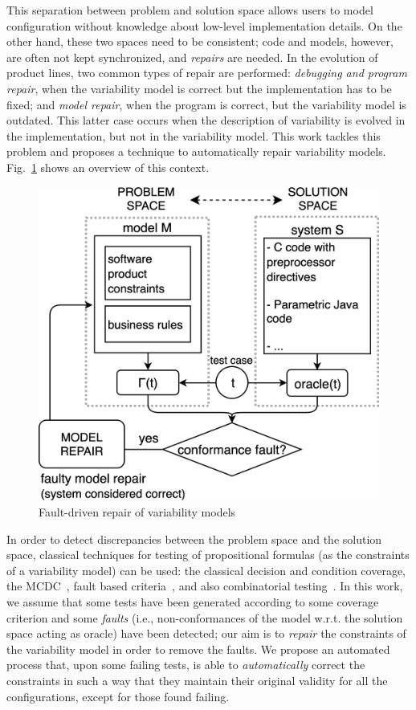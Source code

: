 \begin{tikzborder}{\cite{Gargantini16:validation}}
\begin{tikzborder}{\cite{gargantini_combinatorial_2017}}
\begin{tikzborder}{\cite{gargantini_combinatorial_2017}}
\begin{tikzborder}{\cite{garn2019}}
\begin{tikzborder}{\cite{arcaini2019achieving}}
	This separation between problem and solution space allows users to model configuration without knowledge about low-level implementation details. On the other hand, these two spaces need to be consistent; code and models, however, are often not kept synchronized, and {\it repairs} are needed. In the evolution of product lines, two common types of repair are performed: \textit{debugging and program repair}, when the variability model is correct but the implementation has to be fixed; and \textit{model repair}, when the program is correct, but the variability model is outdated. This latter case occurs when the description of variability is evolved in the implementation, but not in the variability model. This work tackles this problem and proposes a technique to automatically repair variability models. Fig.~\ref{fig:problem_solution} shows an overview of this context.
	\begin{figure}[!htb]
		\centering
		\includegraphics[width=.7\columnwidth]{images/problemSolution_new.png}
		\caption{Fault-driven repair of variability models}
		\label{fig:problem_solution}
	\end{figure}
	
	In order to detect discrepancies between the problem space and the solution space, classical techniques for testing of propositional formulas (as the constraints of a variability model) can be used: the classical decision and condition coverage, the MCDC~\cite{sej.1994.0025}, fault based criteria~\cite{compj15}, and also combinatorial testing~\cite{icst2015}. In this work, we assume that some tests have been generated according to some coverage criterion and some \emph{faults} (i.e., non-conformances of the model w.r.t. the solution space acting as oracle) have been detected; our aim is to \emph{repair} the constraints of the variability model in order to remove the faults. We propose an automated process that, upon some failing tests, is able to \emph{automatically} correct the constraints in such a way that they maintain their original validity for all the configurations, except for those found failing.
	

\end{tikzborder}
\end{tikzborder}
\end{tikzborder}
\end{tikzborder}
\end{tikzborder}
